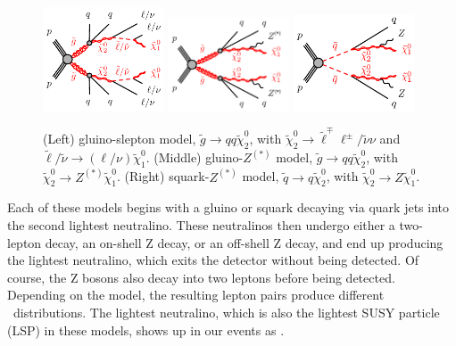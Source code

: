 \begin{figure}[htbp]
    \centering
    \includegraphics[width=0.32\textwidth]{Images/SUSY/gogo-qqqqllllN1N1-N2.pdf}
    \includegraphics[width=0.32\textwidth]{Images/SUSY/gogo-qqqqZZN1N1.pdf}
    \includegraphics[width=0.32\textwidth]{Images/SUSY/sqsq-qqZZN1N1.pdf}
    \caption{(Left) gluino-slepton model, $\tilde{g}\to qq \tilde{\chi}_2^0$, with $\tilde{\chi}_{2}^{0} \to \tilde{\ell}^{\mp}\ell^{\pm} / \tilde{\nu}\nu$ and $\tilde{\ell}/\tilde{\nu} \to (\ell/\nu)\tilde{\chi}_{1}^{0}$. (Middle) gluino-$Z^{(*)}$ model, $\tilde{g}\to qq \tilde{\chi}_2^0$, with $\tilde{\chi}_2^0\rightarrow Z^{(*)} \tilde{\chi}_1^0$. (Right) squark-$Z^{(*)}$ model, $\tilde{q}\to q \tilde{\chi}_2^0$, with $\tilde{\chi}_2^0\rightarrow Z \tilde{\chi}_1^0$.}
    \label{fig:SUSY_models}
\end{figure}

Each of these models begins with a gluino or squark decaying via quark jets into the second lightest neutralino. These neutralinos then undergo either a two-lepton decay, an on-shell Z decay, or an off-shell Z decay, and end up producing the lightest neutralino, which exits the detector without being detected. Of course, the Z bosons also decay into two leptons before being detected. Depending on the model, the resulting lepton pairs produce different \mll\ distributions. The lightest neutralino, which is also the lightest SUSY particle (LSP) in these models, shows up in our events as \MET.

